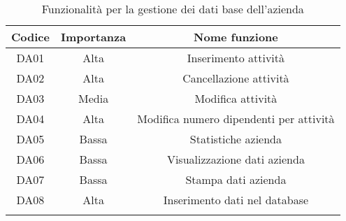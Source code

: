 \setlength{\extrarowheight}{7pt}
\begin{longtable}{|c|c|c|}
\hline 
\textbf{Codice} & \textbf{Importanza} & \textbf{Nome funzione}
\tabularnewline
\hline
DA01 &	Alta 	&	Inserimento attività\tabularnewline
DA02 &	Alta 	&	Cancellazione attività\tabularnewline
DA03 &	Media 	&	Modifica attività\tabularnewline
DA04 &	Alta	&	Modifica numero dipendenti per attività\tabularnewline
DA05 &	Bassa	&	Statistiche azienda\tabularnewline
DA06 &	Bassa	&	Visualizzazione dati azienda\tabularnewline
DA07 &	Bassa	&	Stampa dati azienda\tabularnewline
DA08 &	Alta	&	Inserimento dati nel database\tabularnewline
\hline
\caption{Funzionalità per la gestione dei dati base dell'azienda}
\label{tab:GestioneDatiBaseAzienda}
\end{longtable}